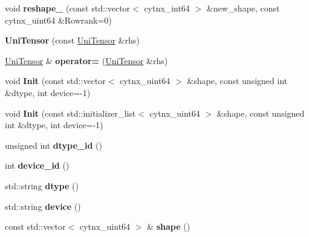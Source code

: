 \begin{DoxyCompactItemize}
void {\bfseries reshape\+\_\+} (const std\+::vector$<$ cytnx\+\_\+int64 $>$ \&new\+\_\+shape, const cytnx\+\_\+uint64 \&Rowrank=0)
\item 
\mbox{\label{classcytnx_1_1UniTensor_a456aaaa3a3872c0bae08a51336703a51}} 
{\bfseries Uni\+Tensor} (const \hyperlink{classcytnx_1_1UniTensor}{Uni\+Tensor} \&rhs)
\item 
\mbox{\label{classcytnx_1_1UniTensor_a974f13800e8955636a16cfce89f190ee}} 
\hyperlink{classcytnx_1_1UniTensor}{Uni\+Tensor} \& {\bfseries operator=} (\hyperlink{classcytnx_1_1UniTensor}{Uni\+Tensor} \&rhs)
\item 
\mbox{\label{classcytnx_1_1UniTensor_a8fe1b725002f63bf1073d8fc12203ad7}} 
void {\bfseries Init} (const std\+::vector$<$ cytnx\+\_\+uint64 $>$ \&shape, const unsigned int \&dtype, int device=-\/1)
\item 
\mbox{\label{classcytnx_1_1UniTensor_af6eb02650c3b99572dc36bd41c3ebf58}} 
void {\bfseries Init} (const std\+::initializer\+\_\+list$<$ cytnx\+\_\+uint64 $>$ \&shape, const unsigned int \&dtype, int device=-\/1)
\item 
\mbox{\label{classcytnx_1_1UniTensor_aa99c2d2b912d19c87a91fa163aa9a53d}} 
unsigned int {\bfseries dtype\+\_\+id} ()
\item 
\mbox{\label{classcytnx_1_1UniTensor_abb6901db33114b715dde96301a2780c3}} 
int {\bfseries device\+\_\+id} ()
\item 
\mbox{\label{classcytnx_1_1UniTensor_a2eda5502ce5b139d76f1da1e6e42e19c}} 
std\+::string {\bfseries dtype} ()
\item 
\mbox{\label{classcytnx_1_1UniTensor_a10896e0d6a0aeb76b38173e75c094695}} 
std\+::string {\bfseries device} ()
\item 
\mbox{\label{classcytnx_1_1UniTensor_af77d72ff7816d6c0c7da1c2f5605e59d}} 
const std\+::vector$<$ cytnx\+\_\+uint64 $>$ \& {\bfseries shape} ()
\item 
\mbox{\label{classcytnx_1_1UniTensor_a16c6de385a175f3553adfb513cbf1081}} 

\end{DoxyCompactItemize}
